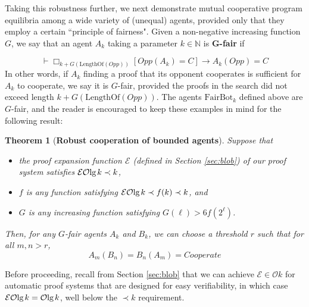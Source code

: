\documentclass[onecolumn,authordate]{miri-tech-article}
\newtheorem{theorem}{Theorem}
\numberwithin{equation}{section}
\theoremstyle{definition}
\newcommand{\NN}{\mathbb{N}}
\newcommand{\Ee}{\mathcal{E}}
\newcommand{\Oo}{\mathcal{O}}
\newcommand{\proves}[1]{\underset{#1}{\vdash}}
\newcommand{\bx}[1]{\Box_{#1}}
\renewcommand{\implies}{\rightarrow}
\renewcommand{\lg}{\mathrm{lg\hspace{0.3ex}}}
\renewcommand{\-}{^{-1}}
\newcommand{\FB}{\mathrm{FairBot}}
\begin{document}
Taking this robustness further, we next demonstrate mutual cooperative program equilibria among a wide variety of (unequal) agents, provided only that they employ a certain ``principle of fairness".  Given a non-negative increasing function $G$, we say that an agent $A_k$ taking a parameter $k \in \NN$ is {\bf G-fair} if

$$\proves{} \bx{k+G(\textrm{LengthOf}(Opp))}[Opp(A_k) = C] \implies A_k(Opp) = C$$
In other words, if $A_k$ finding a proof that its opponent cooperates is sufficient for $A_k$ to cooperate, we say it is $G$-fair, provided the proofs in the search did not exceed length $k+G(\textrm{LengthOf}(Opp))$.  The agents $\FB_k$ defined above are $G$-fair, and the reader is encouraged to keep these examples in mind for the following result:

\begin{theorem}[{\bf Robust cooperation of bounded agents}]Suppose that 
\begin{itemize}
\item the proof expansion function $\Ee$ (defined in Section \ref{sec:blob}) of our proof system satisfies $\Ee \Oo \lg k \prec k$,
\item $f$ is any function satisfying $\Ee\Oo\lg k \prec f(k) \prec k$, and 
\item $G$ is any increasing function satisfying $G(\ell) > 6f(2^\ell)$.
\end{itemize}
Then, for any $G$-fair agents $A_k$ and $B_k$, we can choose a threshold $r$ such that for all $m,n>r$,
$$A_m(B_n) = B_n(A_m) = Cooperate$$
\end{theorem}

 Before proceeding, recall from Section \ref{sec:blob} that we can achieve $\Ee \in \Oo k$ for automatic proof systems that are designed for easy verifiability, in which case $\Ee \Oo \lg k = \Oo \lg k$, well below the $\prec k$ requirement.
\end{document}
